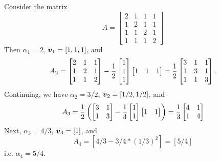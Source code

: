 \begin{example} Consider the matrix
\[
A = \begin{bmatrix}
2 &1 &1 &1 \\
1 & 2 & 1 & 1 \\
1 & 1 & 2 & 1 \\
1 & 1 & 1 & 2
\end{bmatrix}
\]
Then $\ensuremath{\alpha}_1 = 2$, $\bm{{\mbox{\boldmath$v$\unboldmath}}}_1 = [1,1,1]$, and
\[
A_2 = \begin{bmatrix}
2 &1 &1 \\
1 & 2 & 1 \\
1 & 1 & 2
\end{bmatrix} - {1 \over 2} \begin{bmatrix} 1 \\ 1 \\ 1 \end{bmatrix} \begin{bmatrix} 1 & 1 & 1 \end{bmatrix}
={1 \over 2} \begin{bmatrix}
3 & 1 & 1 \\
1 & 3 & 1 \\
1 & 1 & 3
\end{bmatrix}.
\]
Continuing, we have $\ensuremath{\alpha}_2 = 3/2$, $\bm{{\mbox{\boldmath$v$\unboldmath}}}_2 = [1/2,1/2]$, and
\[
A_3 = {1 \over 2} \left( \begin{bmatrix}
3 & 1 \\ 1 & 3
\end{bmatrix} - {1 \over 3} \begin{bmatrix} 1 \\ 1  \end{bmatrix} \begin{bmatrix} 1 & 1  \end{bmatrix}
\right)
= {1 \over 3} \begin{bmatrix} 4 & 1 \\ 1 & 4 \end{bmatrix}
\]
Next, $\ensuremath{\alpha}_3 = 4/3$, $\bm{{\mbox{\boldmath$v$\unboldmath}}}_3 = [1]$, and
\[
A_4 = [4/3 - 3/4 * (1/3)^2] = [5/4]
\]
i.e. $\ensuremath{\alpha}_4 = 5/4$.


\end{example}
